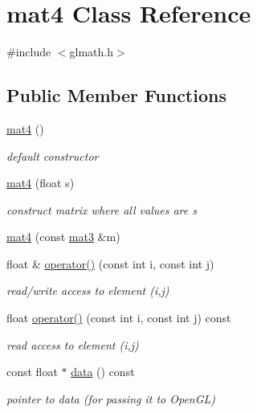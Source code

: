 \hypertarget{classmat4}{}\section{mat4 Class Reference}
\label{classmat4}


{\ttfamily \#include $<$glmath.\+h$>$}

\subsection*{Public Member Functions}
\begin{DoxyCompactItemize}
\item 
\hyperlink{classmat4_acf3f0c37ff5c16e8fb1bfdde2bf87a0f}{mat4} ()
\begin{DoxyCompactList}\small\item\em default constructor \end{DoxyCompactList}\item 
\hyperlink{classmat4_a5efcc4068d4350693982154b0decadc5}{mat4} (float s)
\begin{DoxyCompactList}\small\item\em construct matrix where all values are s \end{DoxyCompactList}\item 
\hyperlink{classmat4_ae56ac11e52c3ff8e1757815c7897769e}{mat4} (const \hyperlink{classmat3}{mat3} \&m)
\item 
float \& \hyperlink{classmat4_a4fd514a46e9cd9e8713456fd5be85e54}{operator()} (const int i, const int j)
\begin{DoxyCompactList}\small\item\em read/write access to element (i,j) \end{DoxyCompactList}\item 
float \hyperlink{classmat4_ade8b8e621a1c42c0d16a898a011414d6}{operator()} (const int i, const int j) const 
\begin{DoxyCompactList}\small\item\em read access to element (i,j) \end{DoxyCompactList}\item 
const float $\ast$ \hyperlink{classmat4_ae20da4790967e26646d42b4f99a271bb}{data} () const 
\begin{DoxyCompactList}\small\item\em pointer to data (for passing it to Open\+GL) \end{DoxyCompactList}\end{DoxyCompactItemize}
